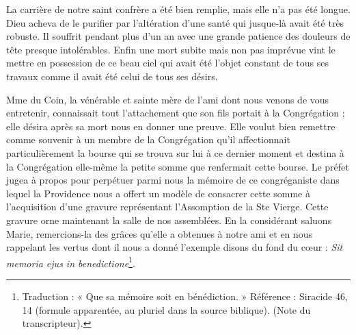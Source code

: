 La carrière de notre saint confrère a été bien remplie, mais elle n'a pas été longue. Dieu acheva de le purifier par l'altération d'une santé qui jusque-là avait été très robuste. Il souffrit pendant plus d'un an avec une grande patience des douleurs de tête presque intolérables. Enfin une mort subite mais non pas imprévue vint le mettre en possession de ce beau ciel qui avait été l'objet constant de tous ses travaux comme il avait été celui de tous ses désirs.

Mme du Coin, la vénérable et sainte mère de l'ami dont nous venons de vous entretenir, connaissait tout l'attachement que son fils portait à la Congrégation ; elle désira après sa mort nous en donner une preuve. Elle voulut bien remettre comme souvenir à un membre de la Congrégation qu'il affectionnait particulièrement la bourse qui se trouva sur lui à ce dernier moment et destina à la Congrégation elle-même la petite somme que renfermait cette bourse. Le préfet jugea à propos pour perpétuer parmi nous la mémoire de ce congréganiste dans lequel la Providence nous a offert un modèle de consacrer cette somme à l'acquisition
d'une gravure représentant l'Assomption de la Ste Vierge. Cette gravure orne maintenant la salle de nos assemblées. En la considérant saluons Marie, remercions-la des grâces qu'elle a obtenues à notre ami et en nous rappelant les vertus dont il nous a donné l'exemple disons du fond du cœur : \textit{Sit memoria ejus in benedictione}\footnote{Traduction : « Que sa mémoire soit en bénédiction. » Référence : Siracide 46, 14 (formule apparentée, au pluriel dans la source biblique). (Note du transcripteur).}.
